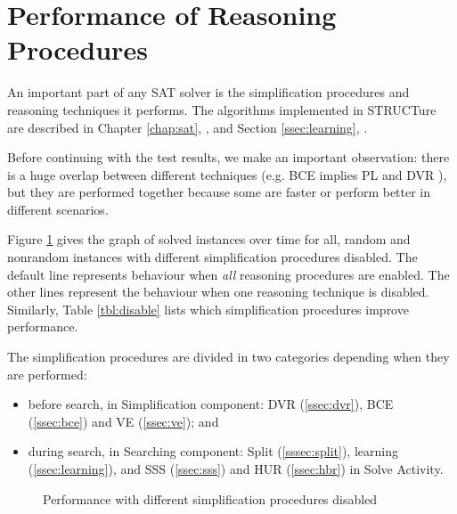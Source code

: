 \section{Performance of Reasoning Procedures}
\label{sec:perf-reasoning}

An important part of any SAT solver is the simplification
procedures and reasoning techniques it performs. The algorithms
implemented in STRUCTure are described in Chapter \ref{chap:sat},
, and Section \ref{ssec:learning},
.

Before continuing with the test results, we make an important
observation: there is a huge overlap between different techniques
(e.g. BCE implies PL and DVR \cite{Jarvisalo_blockedclause}),
but they are performed together because some are faster or perform
better in different scenarios.

Figure \ref{fig:disable} gives the graph of solved instances
over time for all, random and nonrandom instances with different
simplification procedures disabled.  The default line represents
behaviour when \emph{all} reasoning procedures are enabled. The
other lines represent the behaviour when one reasoning technique
is disabled. Similarly, Table \ref{tbl:disable} lists which
simplification procedures improve performance.

The simplification procedures are divided in two categories
depending when they are performed:
\begin{itemize}
  \item before search, in Simplification component:
  DVR (\ref{ssec:dvr}), BCE (\ref{ssec:bce}) and VE (\ref{ssec:ve}); and
  \item during search, in Searching component:
  Split (\ref{sssec:split}), learning (\ref{ssec:learning}),
  and SSS (\ref{ssec:sss}) and HUR (\ref{ssec:hbr}) in Solve Activity.
\end{itemize}

\begin{figure}
  \centering
  \caption{Performance with different simplification procedures disabled}
  \label{fig:disable}
\end{figure}


